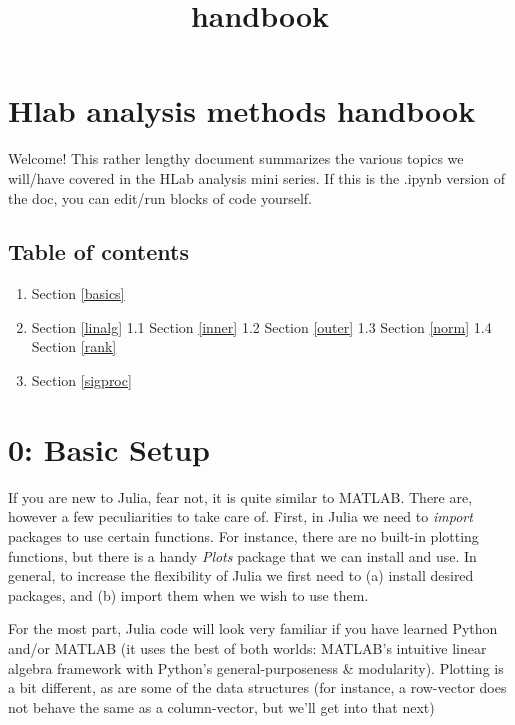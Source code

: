 \documentclass[11pt]{article}
\title{handbook}
\providecommand{\tightlist}{%
      \setlength{\itemsep}{0pt}\setlength{\parskip}{0pt}}
\begin{document}
    
    
    \maketitle
    
    

    
    \hypertarget{hlab-analysis-methods-handbook}{%
\section{Hlab analysis methods
handbook}\label{hlab-analysis-methods-handbook}}

Welcome! This rather lengthy document summarizes the various topics we
will/have covered in the HLab analysis mini series. If this is the
.ipynb version of the doc, you can edit/run blocks of code yourself.

    \hypertarget{table-of-contents}{%
\subsection{Table of contents}\label{table-of-contents}}

\begin{enumerate}
\def\labelenumi{\arabic{enumi}.}
\setcounter{enumi}{-1}
\tightlist
\item
  Section \ref{basics}
\item
  Section \ref{linalg} 1.1 Section \ref{inner} 1.2 Section \ref{outer}
  1.3 Section \ref{norm} 1.4 Section \ref{rank}
\item
  Section \ref{sigproc}
\end{enumerate}

    \hypertarget{basic-setup}{%
\section{0: Basic Setup }\label{basic-setup}}

If you are new to Julia, fear not, it is quite similar to MATLAB. There
are, however a few peculiarities to take care of. First, in Julia we
need to \emph{import} packages to use certain functions. For instance,
there are no built-in plotting functions, but there is a handy
\emph{Plots} package that we can install and use. In general, to
increase the flexibility of Julia we first need to (a) install desired
packages, and (b) import them when we wish to use them.

For the most part, Julia code will look very familiar if you have
learned Python and/or MATLAB (it uses the best of both worlds: MATLAB's
intuitive linear algebra framework with Python's general-purposeness \&
modularity). Plotting is a bit different, as are some of the data
structures (for instance, a row-vector does not behave the same as a
column-vector, but we'll get into that next)
\end{document}
